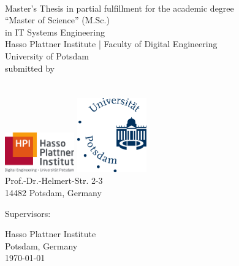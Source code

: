 \begin{titlepage}

\thispagestyle{empty}
\begin{center}
	\Huge
	\TITLE{}\\
	\vspace{1cm}
	\large
	Master's Thesis in partial fulfillment for the academic degree\\
	\LARGE
	“Master of Science” (M.Sc.)\\
	in IT Systems Engineering\\
	\vspace{0.4cm}
	\small
	Hasso Plattner Institute | Faculty of Digital Engineering\\
	University of Potsdam\\
	\vspace{1cm}
	\normalsize
	submitted by\\
	\LARGE
	\textbf{\AUTHOR}\\
	\normalsize
	\Mail{\EMAIL}\\
	\vspace{1cm}
	\includegraphics[width=3cm]{figures/hpi_logo}
	\hspace{1cm}
	\includegraphics[width=3cm]{figures/Universitaet_Potsdam_logo}\\
	\vspace{0.4cm}
	Prof.-Dr.-Helmert-Str. 2-3\\
	14482 Potsdam, Germany\\
\end{center}
  \vspace*{3\baselineskip}


  \begin{minipage}[t]{0.48\textwidth}
    Supervisors:

    \vspace{1\baselineskip}

    \SUPERVISOR
  \end{minipage}
  \hfill
  \begin{minipage}[t]{0.48\textwidth}
    \begin{flushright}
      \vspace{1.5\baselineskip}
      Hasso Plattner Institute\\
      Potsdam, Germany\\
      \today
    \end{flushright}
  \end{minipage}

\end{titlepage}
